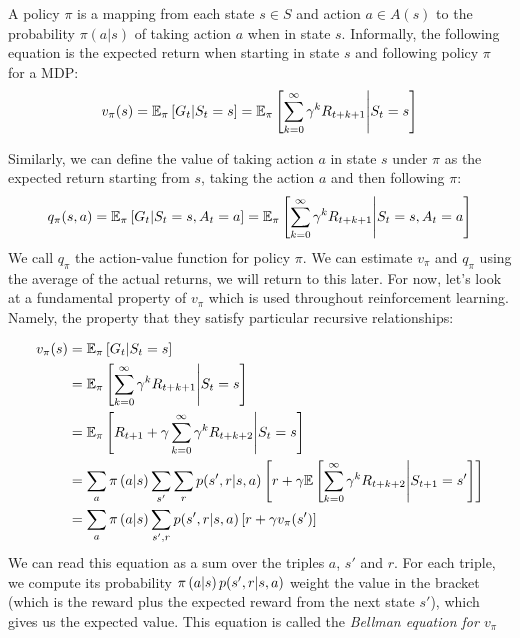     A policy $\pi$ is a mapping from each state $s \in S$ and action $a \in 
    A(s)$ to the probability $\pi(a|s)$ of taking action $a$ when in state $s$. 
    Informally, the following equation is the expected return when starting in 
    state $s$ and following policy $\pi$ for a MDP:
    \begin{equation*}
        v_\pi(s)=\mathbb{E}_\pi\left[G_t\middle\vert
        S_t=s\right]=\mathbb{E}_\pi\left[\sum_{k=0}^{\infty}\gamma^k 
        R_{t+k+1}\middle\vert S_t=s\right]
    \end{equation*}
    
    Similarly, we can define the value of taking action $a$ in state $s$ under 
    $\pi$ as the expected return starting from $s$, taking the action $a$ and 
    then following $\pi$:
    \begin{equation*}
        q_\pi(s,a)=\mathbb{E}_\pi\left[G_t\middle\vert 
        S_t=s,A_t=a\right]=\mathbb{E}_\pi\left[\sum_{k=0}^{\infty}\gamma^kR_{t+k+1}\middle\vert
         S_t=s,A_t=a\right]
    \end{equation*}
    We call $q_\pi$ the action-value function for policy $\pi$. We can estimate 
    $v_\pi$ and $q_\pi$ using the average of the actual returns, we will return 
    to this later. For now, let's look at a fundamental property of $v_\pi$ 
    which is used throughout reinforcement learning. Namely, the property that 
    they satisfy particular recursive relationships:
    
    \begin{align*}
        v_\pi(s)&= \mathbb{E}_\pi\left[G_t\middle\vert S_t=s\right]\\
            &= \mathbb{E}_\pi\left[\sum_{k=0}^{\infty}\gamma^kR_{t+k+1}\middle\vert S_t = 
            s\right]\\
            &= 
            \mathbb{E}_\pi\left[R_{t+1}+\gamma\sum_{k=0}^{\infty}\gamma^kR_{t+k+2} 
            \middle\vert S_t=s\right]\\
            &= \sum_a \pi\left(a\middle\vert s\right) \sum_{s'} \sum_r p(s',r|s,a)
            \left[r+\gamma \mathbb{E}\left[\sum_{k=0}^{\infty}\gamma^k R_{t+k+2} 
            \middle\vert S_{t+1}=s'\right]\right]\\
            &= \sum_a \pi\left(a\middle\vert s\right) \sum_{s',r} p(s',r|s,a) 
            \left[r+\gamma v_\pi(s')\right]
    \end{align*}
    We can read this equation as a sum over the triples $a$, $s'$ and $r$. For 
    each triple, we compute its probability $\pi\left(a\middle\vert s\right)p(s', 
    r|s,a)$ weight the value in the bracket (which is the reward plus the 
    expected reward from the next state $s'$), which gives us the expected 
    value. This equation is called the \textit{Bellman equation for $v_\pi$}
    
